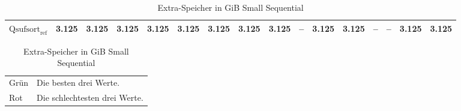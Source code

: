 \begin{table}[h]
{\begin{tabular}{lrrrrrrrrrrrrrrr}
    $\text{Qsufsort}_{\text{ref}}$ & 3.125 & 3.125 & 3.125 & 3.125 & 3.125 & 3.125 & 3.125 & 3.125 & {\color{darkgray}--} & 3.125 & 3.125 & {\color{darkgray}--} & {\color{darkgray}--} & 3.125 & 3.125 \\
\bottomrule
\end{tabular}
}
\caption{Extra-Speicher in GiB Small Sequential}
\label{messung:tab:memory-small-seq-none}
\begin{tabular}{ll}
{\color{green}Grün} & Die besten drei Werte.\\
{\color{red}Rot} & Die schlechtesten drei Werte.\\
\end{tabular}
\end{table}
